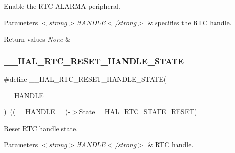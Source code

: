 Enable the R\+TC A\+L\+A\+R\+MA peripheral. 


\begin{DoxyParams}{Parameters}
{\em $<$strong$>$\+H\+A\+N\+D\+L\+E$<$/strong$>$} & specifies the R\+TC handle. \\
\hline
\end{DoxyParams}

\begin{DoxyRetVals}{Return values}
{\em None} & \\
\hline
\end{DoxyRetVals}
\mbox{\label{group___r_t_c___exported___macros_gaf20c09cfca416d79777562ccf7c994a2}} 
\subsubsection{\texorpdfstring{\+\_\+\+\_\+\+H\+A\+L\+\_\+\+R\+T\+C\+\_\+\+R\+E\+S\+E\+T\+\_\+\+H\+A\+N\+D\+L\+E\+\_\+\+S\+T\+A\+TE}{\_\_HAL\_RTC\_RESET\_HANDLE\_STATE}}
{\footnotesize\ttfamily \#define \+\_\+\+\_\+\+H\+A\+L\+\_\+\+R\+T\+C\+\_\+\+R\+E\+S\+E\+T\+\_\+\+H\+A\+N\+D\+L\+E\+\_\+\+S\+T\+A\+TE(\begin{DoxyParamCaption}\item[{}]{\+\_\+\+\_\+\+H\+A\+N\+D\+L\+E\+\_\+\+\_\+ }\end{DoxyParamCaption})~((\+\_\+\+\_\+\+H\+A\+N\+D\+L\+E\+\_\+\+\_\+)-\/$>$State = \hyperlink{group___r_t_c___exported___types_gga1e2460a2d13c4efc7a2a1ab2a1ebd32ba69cd05758f5129525749b65bee6f939f}{H\+A\+L\+\_\+\+R\+T\+C\+\_\+\+S\+T\+A\+T\+E\+\_\+\+R\+E\+S\+ET})}



Reset R\+TC handle state. 


\begin{DoxyParams}{Parameters}
{\em $<$strong$>$\+H\+A\+N\+D\+L\+E$<$/strong$>$} & R\+TC handle. \\
\hline
\end{DoxyParams}

